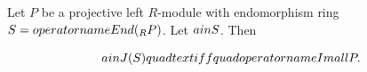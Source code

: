 Let $P$ be a projective left $R$-module with endomorphism ring $S = \\operatorname{End}({}_R P)$. Let $a \\in S$. Then

$$a \\in J(S) \\quad \\text{iff} \\quad \\operatorname{Im} a \\ll P.$$
